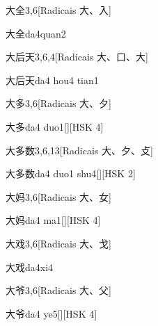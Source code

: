 \begin{entry}{大全}{3,6}[Radicais ⼤、⼊]
  \begin{phonetics}{大全}{da4quan2}
  \end{phonetics}
\end{entry}

\begin{entry}{大后天}{3,6,4}[Radicais ⼤、⼝、⼤]
  \begin{phonetics}{大后天}{da4 hou4 tian1}
  \end{phonetics}
\end{entry}

\begin{entry}{大多}{3,6}[Radicais ⼤、⼣]
  \begin{phonetics}{大多}{da4 duo1}[][HSK 4]
  \end{phonetics}
\end{entry}

\begin{entry}{大多数}{3,6,13}[Radicais ⼤、⼣、⽁]
  \begin{phonetics}{大多数}{da4 duo1 shu4}[][HSK 2]
  \end{phonetics}
\end{entry}

\begin{entry}{大妈}{3,6}[Radicais ⼤、⼥]
  \begin{phonetics}{大妈}{da4 ma1}[][HSK 4]
  \end{phonetics}
\end{entry}

\begin{entry}{大戏}{3,6}[Radicais ⼤、⼽]
  \begin{phonetics}{大戏}{da4xi4}
  \end{phonetics}
\end{entry}

\begin{entry}{大爷}{3,6}[Radicais ⼤、⽗]
  \begin{phonetics}{大爷}{da4 ye5}[][HSK 4]
  \end{phonetics}
\end{entry}

